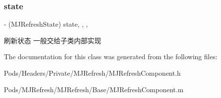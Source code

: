 \subsubsection{\texorpdfstring{state}{state}}
{\footnotesize\ttfamily -\/ (M\+J\+Refresh\+State) state\hspace{0.3cm}{\ttfamily [read]}, {\ttfamily [write]}, {\ttfamily [nonatomic]}, {\ttfamily [assign]}}

刷新状态 一般交给子类内部实现 

The documentation for this class was generated from the following files\+:\begin{DoxyCompactItemize}
\item 
Pods/\+Headers/\+Private/\+M\+J\+Refresh/M\+J\+Refresh\+Component.\+h\item 
Pods/\+M\+J\+Refresh/\+M\+J\+Refresh/\+Base/M\+J\+Refresh\+Component.\+m\end{DoxyCompactItemize}
